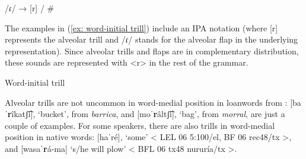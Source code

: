 /ɾ/ → [r] / \#{\longrule}

\z

The examples in (\ref{ex: word-initial trill}) include an IPA notation (where [r] represents the alveolar trill and /ɾ/ stands for the alveolar flap in the underlying representation). Since alveolar trills and flaps are in complementary distribution, these sounds are represented with <r> in the rest of the grammar.


\ea\label{ex: word-initial trill}
{Word-initial trill}

    \z
\z

Alveolar trills are not uncommon in word-medial position in loanwords from : [ba\textbf{ˈr}îkatʃ͡i], ‘bucket’, from \textit{barrica}, and [mo\textbf{ˈr}âltʃ͡i], ‘bag’, from \textit{morral}, are just a couple of examples. For some speakers, there are also trills in word-medial position in native words: [ha\textbf{}ˈré], ‘some’ < LEL 06 5:100/el, BF 06 rec48/tx >, and [wasa\textbf{ˈr}á-ma] ‘s/he will plow’ < BFL 06 tx48 nururía/tx >.

